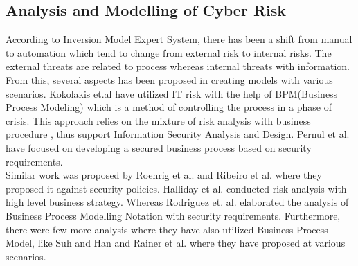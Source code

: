\documentclass[conference]{IEEEtran}
\begin{document}
\subsection{Analysis and Modelling of Cyber Risk}
    According to Inversion Model Expert System, there has been a shift from manual to automation which tend to change from external risk to internal risks. The external threats are related to process whereas internal threats with information. From this, several aspects has been proposed in creating models with various scenarios. Kokolakis et.al\cite{b1} have utilized IT risk with the help of BPM(Business Process Modeling) which is a method of controlling the process in a phase of crisis. This approach relies on the mixture of risk analysis with business procedure , thus support Information Security Analysis and Design. Pernul et al.\cite{b2} have focused on developing a secured business process based on security requirements. 
    \\Similar work was proposed by Roehrig et al.\cite{b3} and Ribeiro et al.\cite{b4} where they proposed it against security policies. Halliday et al.\cite{b5}  conducted risk analysis with high level  business strategy. Whereas Rodriguez et. al.\cite{b6} elaborated the analysis of Business Process Modelling Notation with security requirements. Furthermore, there were few more analysis where they have also utilized Business Process Model, like Suh and Han\cite{b7} and Rainer et al.\cite{b8} where they have proposed at various scenarios. 
\end{document}

